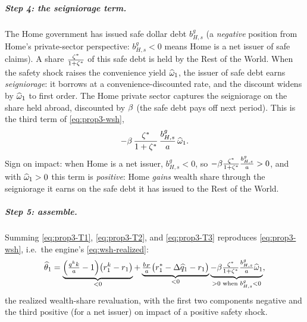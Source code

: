 \subparagraph{Step 4: the seigniorage term.} The Home government has issued safe
dollar debt $b^g_{H,s}$ (a \emph{negative} position from Home's private-sector
perspective: $b^g_{H,s}<0$ means Home is a net issuer of safe claims). A share
$\frac{\zeta^{*}}{1+\zeta^{*}}$ of this safe debt is held by the Rest of the World. When the
safety shock raises the convenience yield $\widehat{\omega}_1$, the issuer of safe debt
earns \emph{seigniorage}: it borrows at a convenience-discounted rate, and the
discount widens by $\widehat{\omega}_1$ to first order. The Home private sector captures
the seigniorage on the share held abroad, discounted by $\beta$ (the safe debt
pays off next period). This is the third term of \eqref{eq:prop3-wsh},
\begin{equation}
-\beta\,\frac{\zeta^{*}}{1+\zeta^{*}}\,\frac{b^g_{H,s}}{a}\,\widehat{\omega}_1. \label{eq:prop3-T3}
\end{equation}
Sign on impact: when Home is a net issuer, $b^g_{H,s}<0$, so
$-\beta\frac{\zeta^{*}}{1+\zeta^{*}}\frac{b^g_{H,s}}{a}>0$, and with $\widehat{\omega}_1>0$ this
term is \emph{positive}: Home \emph{gains} wealth share through the seigniorage it
earns on the safe debt it has issued to the Rest of the World.

\subparagraph{Step 5: assemble.} Summing \eqref{eq:prop3-T1}, \eqref{eq:prop3-T2},
and \eqref{eq:prop3-T3} reproduces \eqref{eq:prop3-wsh}, i.e.\ the engine's
\eqref{eq:wsh-realized}:
\[
\widehat{\theta}_1 = \underbrace{\Bigl(\tfrac{q^{k} k}{a}-1\Bigr)\bigl(r^{k}_1-r_1\bigr)}_{<0}
+\underbrace{\tfrac{b_F}{a}\bigl(r^{*}_1-\Delta\widehat{q}_1-r_1\bigr)}_{<0}
\underbrace{-\beta\tfrac{\zeta^{*}}{1+\zeta^{*}}\tfrac{b^g_{H,s}}{a}\widehat{\omega}_1}_{>0\text{ when }b^g_{H,s}<0},
\]
the realized wealth-share revaluation, with the first two components negative and
the third positive (for a net issuer) on impact of a positive safety shock.

